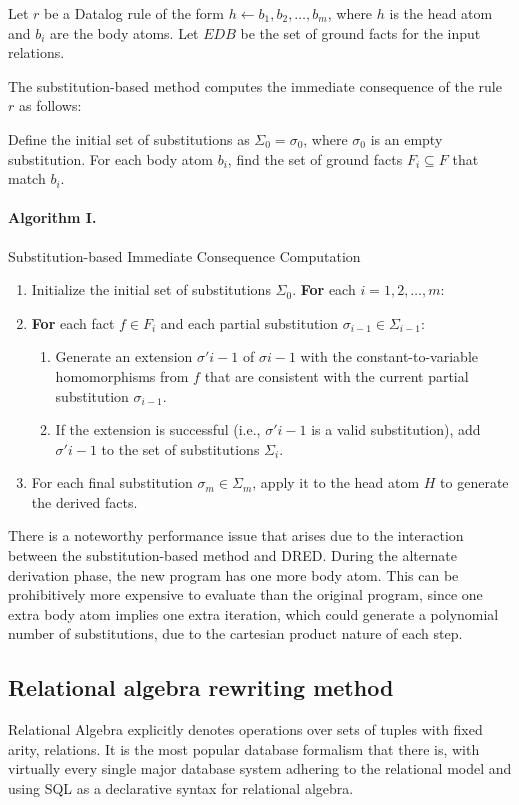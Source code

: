 \documentclass[sigconf,screen,review,natbib]{acmart}
\theoremstyle{definition}
\begin{document}
Let $r$ be a Datalog rule of the form $h \leftarrow b_1, b_2, \ldots, b_m$, where $h$ is the head atom and $b_i$ are
the body atoms. Let $EDB$ be the set of ground facts for the input relations.

The substitution-based method computes the immediate consequence of the rule $r$ as follows:

Define the initial set of substitutions as $\Sigma_0 = { \sigma_0 }$, where $\sigma_0$ is an empty substitution. For
each body atom $b_i$, find the set of ground facts $F_i \subseteq F$ that match $b_i$.

\paragraph{Algorithm I.} Substitution-based Immediate Consequence Computation
\begin{enumerate}
\item Initialize the initial set of substitutions $\Sigma_{0}$.
\textbf{For} each $i = 1, 2, \ldots, m$:
\item \textbf{For} each fact $f \in F_i$ and each partial substitution $\sigma_{i-1} \in \Sigma_{i-1}$:
\begin{enumerate}
	\item Generate an extension $\sigma'{i-1}$ of $\sigma{i-1}$ with the constant-to-variable homomorphisms from $f$ that are
	      consistent with the current partial substitution $\sigma_{i-1}$.
	\item If the extension is successful (i.e., $\sigma'{i-1}$ is a valid substitution), add $\sigma'{i-1}$ to the set of
	      substitutions $\Sigma_i$.
	      \end {enumerate}
	\item For each final substitution $\sigma_m \in \Sigma_m$, apply it to the head atom $H$ to generate the derived facts.
\end{enumerate}

There is a noteworthy performance issue that arises due to the interaction between the substitution-based method
and DRED. During the alternate derivation phase, the new program has one more body atom. This can be prohibitively
more expensive to evaluate than the original program, since one extra body atom implies one extra iteration, which
could generate a polynomial number of substitutions, due to the cartesian product nature of each step.

\subsection{Relational algebra rewriting method}
Relational Algebra\cite{codd_1970} explicitly denotes operations over sets of tuples with fixed
arity, relations. It is the most popular database formalism that there is, with virtually every single
major database system adhering to the relational model\cite{pg,mysql,sqlserver} and using SQL as a
declarative syntax for relational algebra.
\end{document}
